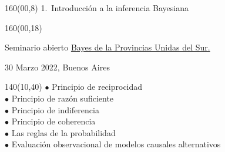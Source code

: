 \documentclass[shownotes,aspectratio=169]{beamer}
\begin{document}
\begin{frame}
\begin{textblock}{160}(00,8)
\centering
\LARGE 1.\ Introducción a la inferencia Bayesiana 
\end{textblock}

\begin{textblock}{160}(00,18) \centering

Seminario abierto \href{https://github.com/BayesDeLasProvinciasUnidasDelSur/curso}{Bayes de la Provincias Unidas del Sur.}

30 Marzo 2022, Buenos Aires
\end{textblock}

\begin{textblock}{140}(10,40) 
$\bullet$ Principio de reciprocidad \\
$\bullet$ Principio de razón suficiente \\
$\bullet$ Principio de indiferencia \\
$\bullet$ Principio de coherencia \\
$\bullet$ Las reglas de la probabilidad \\
$\bullet$ Evaluación observacional de modelos causales alternativos \\
\end{textblock}

\end{frame}
\end{document}
